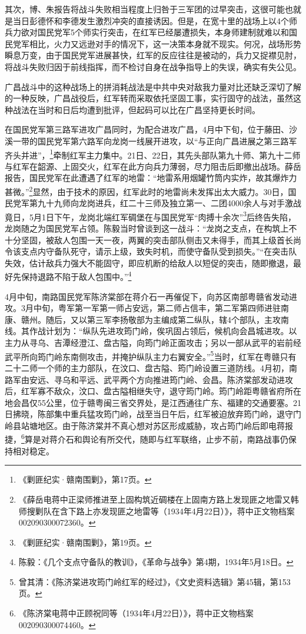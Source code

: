 其次，博、朱报告将战斗失败相当程度上归咎于三军团的过早突击，这很可能也就是当日彭德怀和李德发生激烈冲突的直接诱因。但是，在宽十里的战场上以4个师兵力欲对国民党军5个师实行突击，在红军已经屡遭损失，本身师建制就难以和国民党军相比，火力又远逊对手的情况下，这一决策本身就不现实。何况，战场形势瞬息万变，由于国民党军进展甚快，红军的反应往往是被动的，兵力又捉襟见肘，将战斗失败归因于前线指挥，而不检讨自身在战争指导上的失误，确实有失公见。


广昌战斗中的这种战场上的拼消耗战法是中共中央对敌我力量对比还缺乏深切了解的一种反映，广昌战役后，红军转而采取依托坚固工事，实行固守的战法，虽然这种战法在当时和日后均遭到批评，但起码可以比在广昌坚持更长时间。


在国民党军第三路军进攻广昌同时，为配合进攻广昌，4月中下旬，位于藤田、沙溪一带的国民党军第六路军向龙岗一线展开进攻，以“与正向广昌进展之第三路军齐头并进”，\footnote{《剿匪纪实·赣南围剿》，第17页。}牵制红军主力集中。21日、22日，其先头部队第九十师、第九十二师与红军在韶源、上固交火，红军在此方向兵力薄弱，尽力阻击后即撤出战场。薛岳报告，国民党军在此遭遇了红军的地雷：“地雷系用烟罐竹筒内实炸，故其爆炸力甚微。”\footnote{《薛岳电蒋中正梁师推进至上固构筑近碉楼在上固南方路上发现匪之地雷又韩师搜剿队在含下路上亦发现匪之地雷等（1934年4月22日）》，蒋中正文物档案002090300072360。}显然，由于技术的原因，红军此时的地雷尚未发挥出太大威力。30日，国民党军第九十九师向龙岗进兵，红二十三师及独立第一、二团4000余人与对手激战竟日，5月1日下午，龙岗北端红军碉堡在与国民党军“肉搏十余次”\footnote{《剿匪纪实·赣南围剿》，第19页。}后终告失陷，龙岗随之为国民党军占领。陈毅当时曾谈到这一战斗：“龙岗之支点，在构筑上不十分坚固，被敌人包围一天一夜，两翼的突击部队侧击又未得手，而其上级首长尚令该支点内守备队死守，请示上级，致失时机，而使守备队受到损失。”“在突击队失效，估计敌兵力强大不能固守，即应机断的给敌人以短促的突击，随即撤退，最好先保持退路不陷于敌人包围中。”\footnote{陈毅：《几个支点守备队的教训》，《革命与战争》第4期，1934年5月18日。}


4月中旬，南路国民党军陈济棠部在蒋介石一再催促下，向苏区南部粤赣省发动进攻。3月中旬，粤军第一军第一师占安远，第二师占信丰，第二军第四师进驻南康、赣州。随后，又以第三军李扬敬部为主编成第二纵队，辖4个部队，主攻南线。其作战计划为：“纵队先进攻筠门岭，俟巩固占领后，候机向会昌城进攻。以主力从寻乌、吉潭经澄江、盘古隘，向筠门岭正面攻击；另以一部从武平的岩前经武平所向筠门岭东南侧攻击，并掩护纵队主力右翼安全。”\footnote{曾其清：《陈济棠进攻筠门岭红军的经过》，《文史资料选辑》第45辑，第153页。}当时，红军在粤赣只有二十二师一个师的主力部队，在汶口、盘古隘、筠门岭设置三道防线。4月初，南路军由安远、寻乌和平远、武平两个方向推进筠门岭、会昌。陈济棠部发动进攻后，红军寡不敌众，汶口、盘古隘相继失守，退守筠门岭。筠门岭距粤赣省府所在地会昌仅55公里，位于赣粤闽三省交界处，是江西通往广东、福建的交通要塞。21日拂晓，陈部集中重兵猛攻筠门岭，战至当日午后，红军被迫放弃筠门岭，退守门岭县站塘地区。由于陈济棠并不真心想对苏区形成威胁，攻占筠门岭后即电蒋报捷，\footnote{《陈济棠电蒋中正顾祝同等（1934年4月22日）》，蒋中正文物档案002090300074460。}算是对蒋介石和舆论有所交代，随即与红军联络，止步不前，南路战事仍保持相对稳定。


